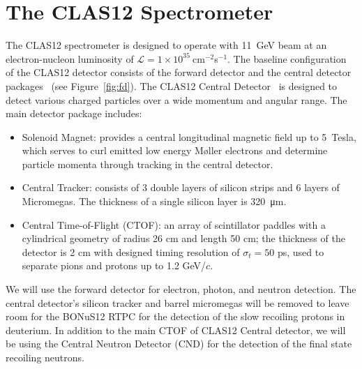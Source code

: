 \section{The CLAS12 Spectrometer}
The CLAS12 spectrometer is designed to operate with 11~GeV beam at an 
electron-nucleon luminosity of $\mathcal{L} = 
1\times10^{35}~$cm$^{-2}$s$^{-1}$. The baseline configuration of the CLAS12 
detector consists of the forward detector and the central detector 
packages~\cite{CD} (see Figure~\ref{fig:fd}).
The CLAS12 Central Detector~\cite{CD} is designed to detect various charged 
particles over a wide momentum and angular range. The main detector package 
includes:
\begin{itemize}
 \item Solenoid Magnet: provides a central longitudinal magnetic field up to 
5~Tesla, which serves to curl emitted low energy M{\o}ller electrons and determine 
particle momenta through tracking in the central detector.
 \item Central Tracker: consists of 3 double layers of silicon strips and 6 
    layers of Micromegas. The thickness of a single silicon layer is  
    \SI{320}{\um}.
 \item Central Time-of-Flight (CTOF): an array of scintillator paddles with a 
    cylindrical geometry of radius 26 cm and length 50 cm; the thickness of the 
      detector is 2 cm with designed timing resolution of $\sigma_t = 50$ ps, 
      used to separate pions and protons up to 1.2 GeV/$c$.
\end{itemize}

We will use the forward detector for electron, photon, and neutron detection.  
The central detector's silicon tracker and barrel micromegas will be removed to 
leave room for the BONuS12 RTPC for the detection of the slow recoiling protons 
in deuterium. In addition to the main CTOF of CLAS12 Central detector, we will 
be using the Central Neutron Detector (CND) for the detection of the final 
state recoiling neutrons.  

